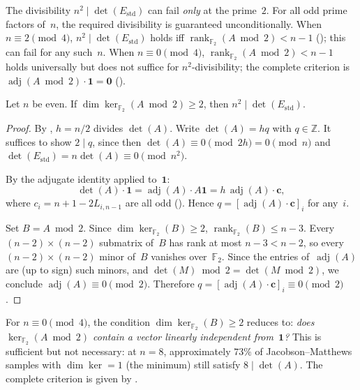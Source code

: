 \documentclass[11pt,a4paper]{article}
\newcommand{\ZZ}{\mathbb{Z}}
\newcommand{\FF}{\mathbb{F}}
\newcommand{\one}{\mathbf{1}}
\newcommand{\rank}{\operatorname{rank}}
\newcommand{\adj}{\operatorname{adj}}
\newcommand{\Estd}{E_{\mathrm{std}}}
\begin{document}
\begin{corollary}\label{cor:obstruction}
The divisibility $n^2\mid\det(\Estd)$ can fail \emph{only} at the
prime~$2$.  For all odd prime factors of~$n$, the required divisibility
is guaranteed unconditionally.  When $n\equiv 2\pmod{4}$,
$n^2\mid\det(\Estd)$ holds iff $\rank_{\FF_2}(A\bmod 2)<n-1$
(); this can fail for any such~$n$.
When $n\equiv 0\pmod{4}$, $\rank_{\FF_2}(A\bmod 2)<n-1$ holds
universally but does not suffice for $n^2$-divisibility;
the complete criterion is $\adj(A\bmod 2)\cdot\one=\mathbf{0}$
().
\end{corollary}

\begin{theorem}\label{thm:4k-sufficient}
Let $n$ be even.  If\/ $\dim\ker_{\FF_2}(A\bmod 2)\ge 2$, then
$n^2\mid\det(\Estd)$.
\end{theorem}

\begin{proof}
By , $h=n/2$ divides $\det(A)$.
Write $\det(A)=hq$ with $q\in\ZZ$.  It suffices to show
$2\mid q$, since then $\det(A)\equiv 0\pmod{2h}=0\pmod{n}$
and $\det(\Estd)=n\det(A)\equiv 0\pmod{n^2}$.

By the adjugate identity applied to~$\one$:
\[
  \det(A)\cdot\one = \adj(A)\cdot A\one = h\,\adj(A)\cdot\mathbf{c},
\]
where $c_i=n+1-2L_{i,n-1}$ are all odd ().
Hence $q = [\adj(A)\cdot\mathbf{c}]_i$ for any~$i$.

Set $B = A\bmod 2$.  Since $\dim\ker_{\FF_2}(B)\ge 2$,
$\rank_{\FF_2}(B)\le n-3$.  Every $(n{-}2)\times(n{-}2)$ submatrix of~$B$
has rank at most $n-3<n-2$, so every $(n{-}2)\times(n{-}2)$ minor of~$B$
vanishes over~$\FF_2$.  Since the entries of~$\adj(A)$ are (up to
sign) such minors, and $\det(M)\bmod 2=\det(M\bmod 2)$, we conclude
$\adj(A)\equiv 0\pmod{2}$.  Therefore
$q=[\adj(A)\cdot\mathbf{c}]_i\equiv 0\pmod{2}$.
\end{proof}

\begin{remark}
For $n\equiv 0\pmod{4}$, the condition $\dim\ker_{\FF_2}(B)\ge 2$
reduces to: \emph{does $\ker_{\FF_2}(A\bmod 2)$ contain a vector
linearly independent from~$\one$?}  This is sufficient but not
necessary: at $n=8$, approximately $73\%$ of Jacobson--Matthews
samples with $\dim\ker=1$ (the minimum) still satisfy $8\mid\det(A)$.
The complete criterion is given by
.
\end{remark}
\end{document}
